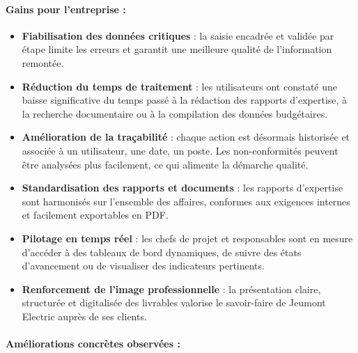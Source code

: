 \documentclass[11pt,a4paper]{article}
\begin{document}
\paragraph{Gains pour l’entreprise :}

\begin{itemize}
    \item \textbf{Fiabilisation des données critiques} : la saisie encadrée et validée par étape limite les erreurs et garantit une meilleure qualité de l’information remontée.

    \item \textbf{Réduction du temps de traitement} : les utilisateurs ont constaté une baisse significative du temps passé à la rédaction des rapports d’expertise, à la recherche documentaire ou à la compilation des données budgétaires.

    \item \textbf{Amélioration de la traçabilité} : chaque action est désormais historisée et associée à un utilisateur, une date, un poste. Les non-conformités peuvent être analysées plus facilement, ce qui alimente la démarche qualité.

    \item \textbf{Standardisation des rapports et documents} : les rapports d’expertise sont harmonisés sur l’ensemble des affaires, conformes aux exigences internes et facilement exportables en PDF.

    \item \textbf{Pilotage en temps réel} : les chefs de projet et responsables sont en mesure d’accéder à des tableaux de bord dynamiques, de suivre des états d’avancement ou de visualiser des indicateurs pertinents.

    \item \textbf{Renforcement de l’image professionnelle} : la présentation claire, structurée et digitalisée des livrables valorise le savoir-faire de Jeumont Electric auprès de ses clients.
\end{itemize}

\paragraph{Améliorations concrètes observées :}
\end{document}
